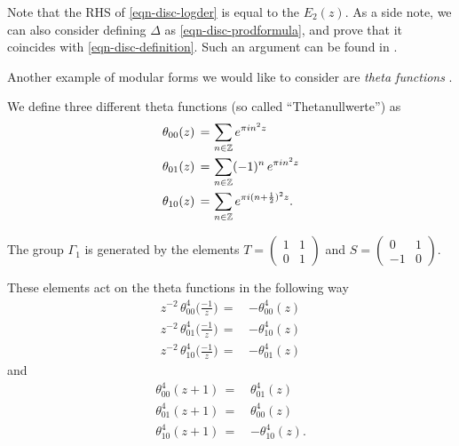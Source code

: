 Note that the RHS of \eqref{eqn-disc-logder} is equal to the $E_2(z)$.
As a side note, we can also consider defining $\Delta$ as \eqref{eqn-disc-prodformula}, and prove that it coincides with \eqref{eqn-disc-definition}.
Such an argument can be found in \cite[Section 2.4]{Bruinier}.

Another example of modular forms we would like to consider are \emph{theta functions} \cite[Section~3.1]{1-2-3}.
\begin{definition}\label{def-th00-th01-th10}
We define three different theta functions (so called ``Thetanullwerte'') as
\begin{align}
  \theta_{00}(z)\,=\, & \sum_{n\in\mathbb{Z}}e^{\pi i n^2 z} \notag \\
  \theta_{01}(z)\,=\, & \sum_{n\in\mathbb{Z}}(-1)^n\,e^{\pi i n^2 z} \notag \\
  \theta_{10}(z)\,=\, & \sum_{n\in\mathbb{Z}}e^{\pi i (n+\frac12)^2 z}. \notag
\end{align}
\end{definition}
The group $\Gamma_1$ is generated by the elements $T=\left(\begin{smallmatrix}1&1\\0&1\end{smallmatrix}\right)$ and $S=\left(\begin{smallmatrix}0&1\\-1&0\end{smallmatrix}\right)$.
\begin{lemma}\label{lemma-theta-transform-S-T}
These elements act on the theta functions in the following way
\begin{align}
z^{-2}\,\theta^4_{00}\Big(\frac{-1}{z}\Big)\,=\,&-\theta_{00}^4(z) \label{eqn: theta transform S}\\
z^{-2}\,\theta^4_{01}\Big(\frac{-1}{z}\Big)\,=\,&-\theta_{10}^4(z) \label{eqn: theta01 transform S}\\
z^{-2}\,\theta^4_{10}\Big(\frac{-1}{z}\Big)\,=\,&-\theta_{01}^4(z) \label{eqn: theta10 transform S}
\end{align}
and
\begin{align}
\theta^4_{00}(z+1)\,=\,&\theta_{01}^4(z) \label{eqn: theta10 transform T}\\
\theta^4_{01}(z+1)\,=\,&\theta_{00}^4(z) \label{eqn: theta01 transform T} \\
\theta^4_{10}(z+1)\,=\,&-\theta_{10}^4(z). \label{eqn: theta transform T}
\end{align}
\end{lemma}
